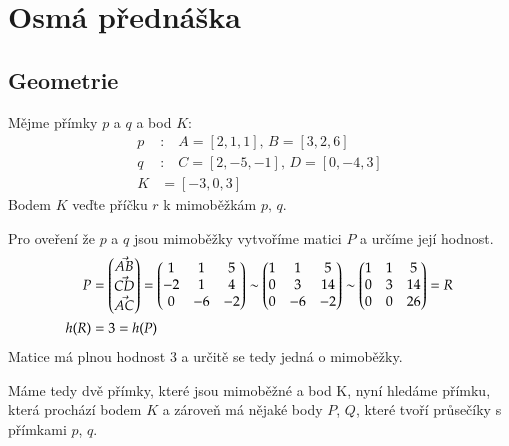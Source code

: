 \section{Osmá přednáška}
\subsection{Geometrie}

\begin{example}
    Mějme přímky $p$ a $q$ a bod $K$:
    \begin{align*}
        p&:\;\;\;A=[2, 1, 1],\,B = [3, 2, 6]\\
        q&:\;\;\;C=[2, -5, -1],\,D = [0, -4, 3]\\
        K &= [-3, 0, 3]
    \end{align*}
    Bodem $K$ veďte příčku $r$ k mimoběžkám $p,\,q$.

    Pro oveření že $p$ a $q$ jsou mimoběžky vytvoříme matici $P$ a určíme její hodnost.
    \begin{align*}
        P &= \begin{pmatrix}
            \vec{AB}\\
            \vec{CD}\\
            \vec{AC}
        \end{pmatrix} =
        \begin{pmatrix}
            1 & 1 & 5\\
            -2 & 1 & 4\\
            0 & -6 & -2
        \end{pmatrix} \overset{} \sim
        \begin{pmatrix}
            1 & 1 & 5\\
            0 & 3 & 14\\
            0 & -6 & -2
        \end{pmatrix} \overset{} \sim
        \begin{pmatrix}
            1 & 1 & 5\\
            0 & 3 & 14\\
            0 & 0 & 26
        \end{pmatrix} = R\\
        h(R) &= 3 = h(P)
    \end{align*}
    Matice má plnou hodnost $3$ a určitě se tedy jedná o mimoběžky.

    Máme tedy dvě přímky, které jsou mimoběžné a bod K, nyní hledáme
    přímku, která prochází bodem $K$ a zároveň má nějaké body $P$, $Q$,
    které tvoří průsečíky s přímkami $p$, $q$.


\end{example}
